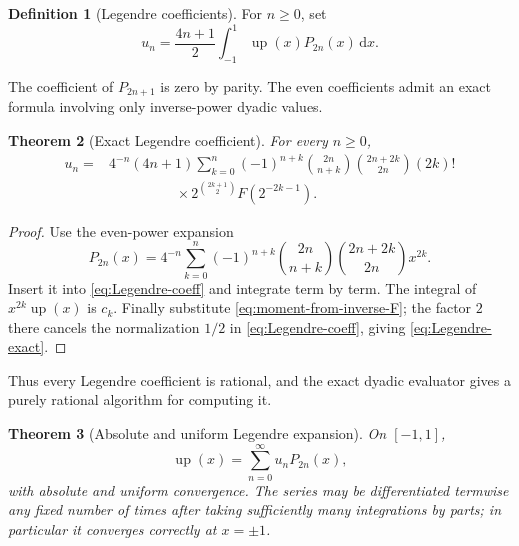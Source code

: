 \documentclass[11pt,oneside]{article}
\newtheorem{theorem}{Theorem}[section]
\theoremstyle{definition}
\newtheorem{definition}[theorem]{Definition}
\theoremstyle{remark}
\newcommand{\upf}{\operatorname{up}}
\newcommand{\dd}{\,\mathrm d}
\begin{document}
\begin{definition}[Legendre coefficients]\label{def:Legendre-coeff}
For $n\ge0$, set
\begin{equation}\label{eq:Legendre-coeff}
  u_n=\frac{4n+1}{2}\int_{-1}^{1}\upf(x)P_{2n}(x)\dd x.
\end{equation}
\end{definition}

The coefficient of $P_{2n+1}$ is zero by parity.  The even coefficients admit an
exact formula involving only inverse-power dyadic values.

\begin{theorem}[Exact Legendre coefficient]\label{thm:Legendre-exact}
For every $n\ge0$,
\begin{equation}\label{eq:Legendre-exact}
\begin{split}
 u_n={}&4^{-n}(4n+1)
 \sum_{k=0}^{n}(-1)^{n+k}
 \binom{2n}{n+k}\binom{2n+2k}{2n}(2k)!\\
 &\hspace{2cm}\times
 2^{\binom{2k+1}{2}}F(2^{-2k-1}).
\end{split}
\end{equation}
\end{theorem}

\begin{proof}
Use the even-power expansion
\begin{equation}\label{eq:Legendre-even-power}
 P_{2n}(x)=4^{-n}\sum_{k=0}^{n}(-1)^{n+k}
 \binom{2n}{n+k}\binom{2n+2k}{2n}x^{2k}.
\end{equation}
Insert it into \eqref{eq:Legendre-coeff} and integrate term by term.  The integral
of $x^{2k}\upf(x)$ is $c_k$.  Finally substitute
\eqref{eq:moment-from-inverse-F}; the factor $2$ there cancels the normalization
$1/2$ in \eqref{eq:Legendre-coeff}, giving \eqref{eq:Legendre-exact}.
\end{proof}

Thus every Legendre coefficient is rational, and the exact dyadic evaluator gives
a purely rational algorithm for computing it.

\begin{theorem}[Absolute and uniform Legendre expansion]\label{thm:Legendre-uniform}
On $[-1,1]$,
\begin{equation}\label{eq:Legendre-series}
  \upf(x)=\sum_{n=0}^{\infty}u_nP_{2n}(x),
\end{equation}
with absolute and uniform convergence.  The series may be differentiated termwise
any fixed number of times after taking sufficiently many integrations by parts; in
particular it converges correctly at $x=\pm1$.
\end{theorem}
\end{document}
